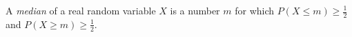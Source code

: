 
A \emph{median} of a real random variable $X$ is a number $m$ for which $P(X\le m)\ge\frac12$ and $P(X\ge m)\ge\frac12$.
